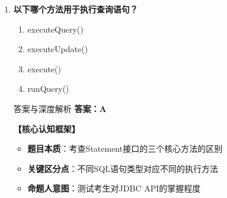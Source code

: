 \documentclass[12pt, a4paper]{ctexart}
\begin{document}
\begin{enumerate}[label=\textbf{\arabic*.}]
	\item \textbf{以下哪个方法用于执行查询语句？}
	      \begin{enumerate}[label=\Alph*.]
		      \item executeQuery()
		      \item executeUpdate()
		      \item execute()
		      \item runQuery()
	      \end{enumerate}

	      \begin{bluebox}{答案与深度解析}
		      \textbf{答案：A}

		      \textbf{【核心认知框架】}
		      \begin{itemize}[label={}, leftmargin=*, nosep]
			      \item \textbf{题目本质}：考查Statement接口的三个核心方法的区别
			      \item \textbf{关键区分点}：不同SQL语句类型对应不同的执行方法
			      \item \textbf{命题人意图}：测试考生对JDBC API的掌握程度
		      \end{itemize}


\end{bluebox}
\end{enumerate}
\end{document}
